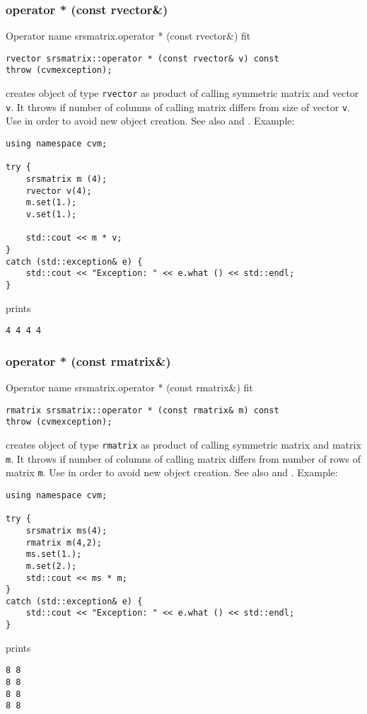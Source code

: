 \subsubsection{operator * (const rvector\&)}
Operator%
\pdfdest name {srsmatrix.operator * (const rvector&)} fit
\begin{verbatim}
rvector srsmatrix::operator * (const rvector& v) const
throw (cvmexception);
\end{verbatim}
creates  object of type \verb"rvector"
as  product of  calling symmetric matrix and  vector \verb"v".
It throws  
if  number of columns of  calling matrix
differs from  size of  vector \verb"v".
Use 
in order to avoid new object creation.
See also
 and .
Example:
\begin{Verbatim}
using namespace cvm;

try {
    srsmatrix m (4);
    rvector v(4);
    m.set(1.);
    v.set(1.);

    std::cout << m * v;
}
catch (std::exception& e) {
    std::cout << "Exception: " << e.what () << std::endl;
}
\end{Verbatim}
prints
\begin{Verbatim}
4 4 4 4
\end{Verbatim}
\newpage



\subsubsection{operator * (const rmatrix\&)}
Operator%
\pdfdest name {srsmatrix.operator * (const rmatrix&)} fit
\begin{verbatim}
rmatrix srsmatrix::operator * (const rmatrix& m) const
throw (cvmexception);
\end{verbatim}
creates  object of type \verb"rmatrix"
as  product of  calling symmetric matrix and  matrix \verb"m".
It throws  
if  number of columns of  calling matrix
differs from  number of rows of  matrix \verb"m".
Use  in order to avoid
 new object creation.
See also
 and .
Example:
\begin{Verbatim}
using namespace cvm;

try {
    srsmatrix ms(4);
    rmatrix m(4,2);
    ms.set(1.);
    m.set(2.);
    std::cout << ms * m;
}
catch (std::exception& e) {
    std::cout << "Exception: " << e.what () << std::endl;
}
\end{Verbatim}
prints
\begin{Verbatim}
8 8
8 8
8 8
8 8
\end{Verbatim}
\newpage



